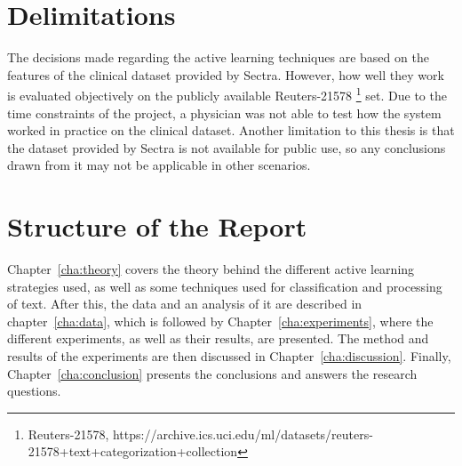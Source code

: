 \section{Delimitations}
\label{sec:delimitations}

The decisions made regarding the active learning techniques are based on the features of the clinical dataset provided by Sectra.
However, how well they work is evaluated objectively on the publicly available Reuters-21578 \footnote{Reuters-21578, https://archive.ics.uci.edu/ml/datasets/reuters-21578+text+categorization+collection} set.
Due to the time constraints of the project, a physician was not able to test how the system worked in practice on the clinical dataset.
Another limitation to this thesis is that the dataset provided by Sectra is not available for public use, so any conclusions drawn from it may not be applicable in other scenarios.

\section{Structure of the Report}
\label{sec:structure}

Chapter~\ref{cha:theory} covers the theory behind the different active learning strategies used, as well as some techniques used for classification and processing of text.
After this, the data and an analysis of it are described in chapter~\ref{cha:data}, which is followed by Chapter~\ref{cha:experiments}, where the different experiments, as well as their results, are presented.
The method and results of the experiments are then discussed in Chapter~\ref{cha:discussion}.
Finally, Chapter~\ref{cha:conclusion} presents the conclusions and answers the research questions.
